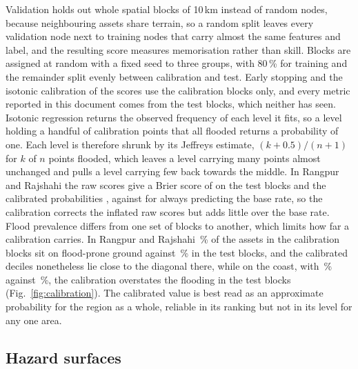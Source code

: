 \documentclass[10pt,a4paper,twocolumn]{article}
\begin{document}
Validation holds out whole spatial blocks of 10\,km instead of random nodes, because neighbouring assets share terrain, so a random split leaves every validation node next to training nodes that carry almost the same features and label, and the resulting score measures memorisation rather than skill. Blocks are assigned at random with a fixed seed to three groups, with 80\,\% for training and the remainder split evenly between calibration and test. Early stopping and the isotonic calibration of the scores use the calibration blocks only, and every metric reported in this document comes from the test blocks, which neither has seen. Isotonic regression returns the observed frequency of each level it fits, so a level holding a handful of calibration points that all flooded returns a probability of one. Each level is therefore shrunk by its Jeffreys estimate, $(k+0.5)/(n+1)$ for $k$ of $n$ points flooded, which leaves a level carrying many points almost unchanged and pulls a level carrying few back towards the middle. In Rangpur and Rajshahi the raw scores give a Brier score of \RRValBrier{} on the test blocks and the calibrated probabilities \RRValBrierCalibrated{}, against \RRValBrierBaseRate{} for always predicting the base rate, so the calibration corrects the inflated raw scores but adds little over the base rate. Flood prevalence differs from one set of blocks to another, which limits how far a calibration carries. In Rangpur and Rajshahi \RRCalibBlockRate{}\,\% of the assets in the calibration blocks sit on flood-prone ground against \RRTestBlockRate{}\,\% in the test blocks, and the calibrated deciles nonetheless lie close to the diagonal there, while on the coast, with \CoastalCalibBlockRate{}\,\% against \CoastalTestBlockRate{}\,\%, the calibration overstates the flooding in the test blocks (Fig.~\ref{fig:calibration}). The calibrated value is best read as an approximate probability for the region as a whole, reliable in its ranking but not in its level for any one area.

\subsection{Hazard surfaces}
\label{sec:hazard}
\end{document}
